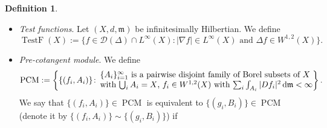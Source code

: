 \documentclass[10pt,a4paper]{amsart}
\numberwithin{equation}{section}
\theoremstyle{definition}
\newtheorem{Def}[Thm]{Definition}
\newcommand{\PCM}{\operatorname{PCM}}
\newcommand{\TestF}{\operatorname{TestF}}
\newcommand{\Ch}{\operatorname{Ch}}
\newcommand{\R}{\mathbb{R}}
\newcommand{\mf}{\mathfrak{m}}
\newcommand{\D}{\mathcal{D}}
\begin{document}
\begin{Def}
\begin{itemize}
\begin{itemize}
\[
\int_X g P_t f\,{\rm d}\mf=\int_X f P_t g\,{\rm d}\mf
\]
for any $f,g\in L^2(X)$.
\item For each $s,t>0$, we have $P_{s+t}=P_s\circ P_t$.
\item For each $f\in \D(\Delta)$ and $s>0$, we have that
\[
\lim_{t\to 0+} \frac{P_t f-f}{t}=\Delta f
\]
in $L^2(X)$ and that $\Delta P_s f =P_s \Delta f$.
\item For each $t>0$, $c\in \R$ and $f\in L^2(X)$ with $f\leq c$ $\mf$-a.e.\ in $X$, we have $P_t f\leq c$ $\mf$-a.e.\ in $X$.
\item For each $t>0$, $p\in [1,\infty)$ and $f\in L^2(X)\cap L^p(X)$, we have $\|P_t f\|_{L^p}\leq \|f\|_{L^p}$.
In~particular, we can extend the map $P_t\colon L^2(X)\cap L^p(X)\to L^2(X)\cap L^p(X)$ to~$P_t$: $L^p(X)\to L^p(X)$.
\end{itemize}
We can also show the following properties by the above properties:
\begin{itemize}\itemsep=0pt
\item For each $f\in W^{1,2}(X)$, we have $\Ch(P_t f-f)\to 0$ as $t\to 0$. Indeed, the properties $\Ch(P_t f)\leq \Ch(f)$ and $P_t f\to f$ in $L^2$ as $t\to 0$ imply that $P_t f$ converges to $f$ weakly in~$W^{1,2}$, and so $\limsup\limits_{t\to 0}\Ch(P_t f)\leq \Ch(f)$ implies that $P_t f$ converges to $f$ strongly in~$W^{1,2}$ as~$t\to 0$.
\item For each $p\in [1,\infty)$ and $f\in L^p(X)$, we have $\|P_t f-f\|_{L^p}\to 0$ as $t\to 0$. This can be verified by applying the above properties to the truncated function $f_1=\max\{\min\{f,c\},-c\}$ for a sufficiently large constant \mbox{$c\!>\!0$} and its remaining part~\mbox{$f\!-\!f_1$}.
\end{itemize}
\item \emph{Test functions}. Let $(X,d,\mf)$ be infinitesimally Hilbertian. We define
\[
\TestF(X):=\big\{f\in\D(\Delta)\cap L^\infty(X)\colon |\nabla f|\in L^\infty(X)\text{ and }\Delta f\in W^{1,2}(X)\big\} .
\]
\item \emph{Pre-cotangent module}. We define
\[
\PCM:=\left\{\{(f_i,A_i)\}\colon\,
\begin{array}{@{}l@{}}\text{$\{A_i\}_{i=1}^\infty$ is a pairwise disjoint family of Borel subsets of $X$}\\
\text{with $\bigcup_{i} A_i=X$, $f_i\in W^{1,2}(X)$ with $\sum_{i} \int_{A_i} |D f_i|^2\,{\rm d}\mf<\infty$}
\end{array}
\right\}.
\]
We say that $\{(f_i,A_i)\}\in \PCM$ is equivalent to $\{(g_i,B_i)\}\in \PCM$ (denote it by $\{(f_i,A_i)\}\sim\{(g_i,B_i)\}$) if

\end{itemize}
\end{Def}
\end{document}
